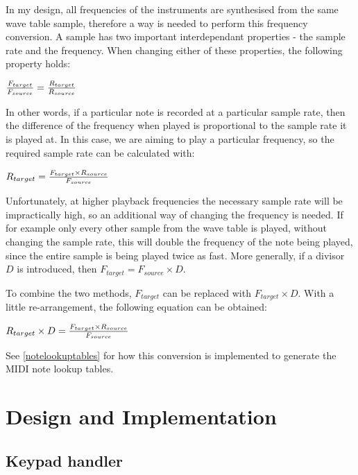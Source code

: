 \documentclass[a4paper,10pt]{article}
\begin{document}
In my design, all frequencies of the instruments are synthesised from the same wave table sample, 
therefore a way is needed to perform this frequency conversion.  A sample has two important 
interdependant properties - the sample rate and the frequency.  When changing either of these 
properties, the following property holds:

\begin{center}
${{F_{target}} \over {F_{source}}} = {{R_{target}} \over {R_{source}}}$
\end{center}

In other words, if a particular note is recorded at a particular sample rate, then the difference of 
the frequency when played is proportional to the sample rate it is played at.  In this case, we are 
aiming to play a particular frequency, so the required sample rate can be calculated with:

\begin{center}
${{R_{target}} = {{F_{target} \times {R_{source}}} \over {F_{source}}}}$
\end{center}

Unfortunately, at higher playback frequencies the necessary sample rate will be impractically high, 
so an additional way of changing the frequency is needed.  If for example only every other sample 
from the wave table is played, without changing the sample rate, this will double the frequency of 
the note being played, since the entire sample is being played twice as fast.  More generally, if a 
divisor $D$ is introduced, then ${F_{target}} = {F_{source} \times D}$.

To combine the two methods, $F_{target}$ can be replaced with ${F_{target}} \times D$.  With a 
little re-arrangement, the following equation can be obtained:

\begin{center}
${{R_{target}} \times D} = {{{F_{target} \times {R_{source}}} \over {F_{source}}}}$
\end{center}

See \ref{notelookuptables} for how this conversion is implemented to generate the MIDI note lookup 
tables.

\pagebreak
\section{Design and Implementation}

\subsection{Keypad handler}
\end{document}

